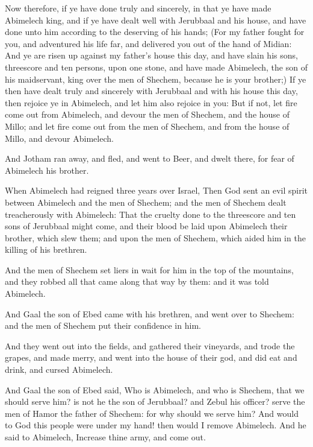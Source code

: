 \Verse Now therefore, if ye have done truly and sincerely, in that ye have made Abimelech king, and if ye have dealt well with Jerubbaal and his house, and have done unto him according to the deserving of his hands; \Verse (For my father fought for you, and adventured his life far, and delivered you out of the hand of Midian: \Verse And ye are risen up against my father's house this day, and have slain his sons, threescore and ten persons, upon one stone, and have made Abimelech, the son of his maidservant, king over the men of Shechem, because he is your brother;) \Verse If ye then have dealt truly and sincerely with Jerubbaal and with his house this day, then rejoice ye in Abimelech, and let him also rejoice in you: \Verse But if not, let fire come out from Abimelech, and devour the men of Shechem, and the house of Millo; and let fire come out from the men of Shechem, and from the house of Millo, and devour Abimelech.

\Verse And Jotham ran away, and fled, and went to Beer, and dwelt there, for fear of Abimelech his brother.

\Verse When Abimelech had reigned three years over Israel, \Verse Then God sent an evil spirit between Abimelech and the men of Shechem; and the men of Shechem dealt treacherously with Abimelech: \Verse That the cruelty done to the threescore and ten sons of Jerubbaal might come, and their blood be laid upon Abimelech their brother, which slew them; and upon the men of Shechem, which aided him in the killing of his brethren.

\Verse And the men of Shechem set liers in wait for him in the top of the mountains, and they robbed all that came along that way by them: and it was told Abimelech.

\Verse And Gaal the son of Ebed came with his brethren, and went over to Shechem: and the men of Shechem put their confidence in him.

\Verse And they went out into the fields, and gathered their vineyards, and trode the grapes, and made merry, and went into the house of their god, and did eat and drink, and cursed Abimelech.

\Verse And Gaal the son of Ebed said, Who is Abimelech, and who is Shechem, that we should serve him? is not he the son of Jerubbaal? and Zebul his officer? serve the men of Hamor the father of Shechem: for why should we serve him?  \Verse And would to God this people were under my hand! then would I remove Abimelech. And he said to Abimelech, Increase thine army, and come out.

